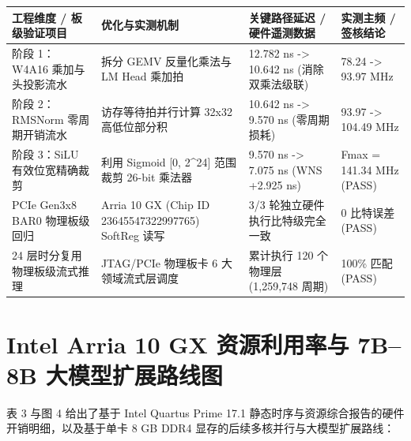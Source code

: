 \documentclass[11pt,a4paper]{article}
\begin{document}
{\footnotesize\renewcommand{\arraystretch}{1.14}\begin{longtable}{@{}L{0.23\textwidth}L{0.27\textwidth}L{0.24\textwidth}L{0.16\textwidth}@{}}\toprule

\textbf{工程维度 /\allowbreak{} 板级验证项目} & \textbf{优化与实测机制} & \textbf{关键路径延迟 /\allowbreak{} 硬件遥测数据} & \textbf{实测主频 /\allowbreak{} 签核结论}\\\midrule\endhead

阶段 1：W4A16 乘加与头投影流水 & 拆分 GEMV 反量化乘法与 LM Head 乘加拍 & 12.782 ns -> 10.642 ns (\allowbreak{}消除双乘法级联)\allowbreak{} & 78.24 -> 93.97 MHz\\[2pt]

阶段 2：RMSNorm 零周期开销流水 & 访存等待拍并行计算 32x32 高低位部分积 & 10.642 ns -> 9.570 ns (\allowbreak{}零周期损耗)\allowbreak{} & 93.97 -> 104.49 MHz\\[2pt]

阶段 3：SiLU 有效位宽精确裁剪 & 利用 Sigmoid [\allowbreak{}0,\allowbreak{} 2\textasciicircum{}24]\allowbreak{} 范围裁剪 26-bit 乘法器 & 9.570 ns -> 7.075 ns (\allowbreak{}WNS +\allowbreak{}2.925 ns)\allowbreak{} & Fmax =\allowbreak{} 141.34 MHz (\allowbreak{}PASS)\allowbreak{}\\[2pt]

PCIe Gen3x8 BAR0 物理板级回归 & Arria 10 GX (\allowbreak{}Chip ID 23645547\allowbreak{}32299776\allowbreak{}5)\allowbreak{} SoftReg 读写 & 3/\allowbreak{}3 轮独立硬件执行比特级完全一致 & 0 比特误差 (\allowbreak{}PASS)\allowbreak{}\\[2pt]

24 层时分复用物理板级流式推理 & JTAG/\allowbreak{}PCIe 物理板卡 6 大领域流式层调度 & 累计执行 120 个物理层 (\allowbreak{}1,\allowbreak{}259,\allowbreak{}748 周期)\allowbreak{} & 100\% 匹配 (\allowbreak{}PASS)\allowbreak{}\\[2pt]

\bottomrule\end{longtable}}

\section{Intel Arria 10 GX 资源利用率与 7B–8B 大模型扩展路线图}

表 3 与图 4 给出了基于 Intel Quartus Prime 17.1 静态时序与资源综合报告的硬件开销明细，以及基于单卡 8 GB DDR4 显存的后续多核并行与大模型扩展路线：
\end{document}
